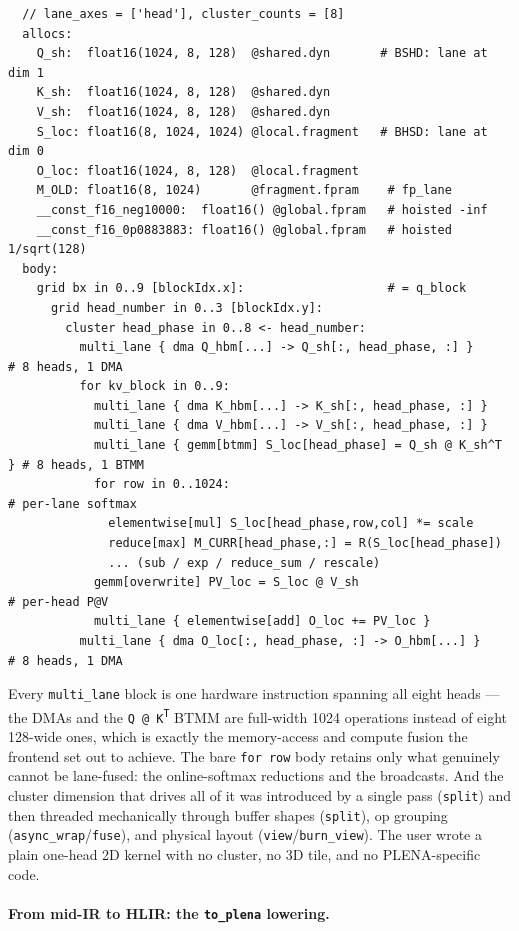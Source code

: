 \documentclass[
  10pt,
]{article}
\begin{document}
\begin{verbatim}
  // lane_axes = ['head'], cluster_counts = [8]
  allocs:
    Q_sh:  float16(1024, 8, 128)  @shared.dyn       # BSHD: lane at dim 1
    K_sh:  float16(1024, 8, 128)  @shared.dyn
    V_sh:  float16(1024, 8, 128)  @shared.dyn
    S_loc: float16(8, 1024, 1024) @local.fragment   # BHSD: lane at dim 0
    O_loc: float16(1024, 8, 128)  @local.fragment
    M_OLD: float16(8, 1024)       @fragment.fpram    # fp_lane
    __const_f16_neg10000:  float16() @global.fpram   # hoisted -inf
    __const_f16_0p0883883: float16() @global.fpram   # hoisted 1/sqrt(128)
  body:
    grid bx in 0..9 [blockIdx.x]:                    # = q_block
      grid head_number in 0..3 [blockIdx.y]:
        cluster head_phase in 0..8 <- head_number:
          multi_lane { dma Q_hbm[...] -> Q_sh[:, head_phase, :] }      # 8 heads, 1 DMA
          for kv_block in 0..9:
            multi_lane { dma K_hbm[...] -> K_sh[:, head_phase, :] }
            multi_lane { dma V_hbm[...] -> V_sh[:, head_phase, :] }
            multi_lane { gemm[btmm] S_loc[head_phase] = Q_sh @ K_sh^T } # 8 heads, 1 BTMM
            for row in 0..1024:                                         # per-lane softmax
              elementwise[mul] S_loc[head_phase,row,col] *= scale
              reduce[max] M_CURR[head_phase,:] = R(S_loc[head_phase])
              ... (sub / exp / reduce_sum / rescale)
            gemm[overwrite] PV_loc = S_loc @ V_sh                       # per-head P@V
            multi_lane { elementwise[add] O_loc += PV_loc }
          multi_lane { dma O_loc[:, head_phase, :] -> O_hbm[...] }      # 8 heads, 1 DMA
\end{verbatim}

Every \texttt{multi\_lane} block is one hardware instruction spanning all
eight heads --- the DMAs and the \texttt{Q\,@\,K\textsuperscript{T}} BTMM
are full-width 1024 operations instead of eight 128-wide ones, which is
exactly the memory-access and compute fusion the frontend set out to
achieve. The bare \texttt{for row} body retains only what genuinely
cannot be lane-fused: the online-softmax reductions and the broadcasts.
And the cluster dimension that drives all of it was introduced by a
single pass (\texttt{split}) and then threaded mechanically through buffer
shapes (\texttt{split}), op grouping (\texttt{async\_wrap}/\texttt{fuse}),
and physical layout (\texttt{view}/\texttt{burn\_view}). The user wrote a
plain one-head 2D kernel with no cluster, no 3D tile, and no
PLENA-specific code.

\paragraph{From mid-IR to HLIR: the \texttt{to\_plena}
lowering.}\label{frontend-to-plena}
\end{document}
